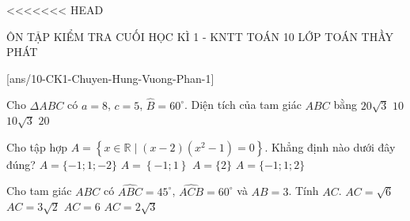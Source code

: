 <<<<<<< HEAD
\begin{name}
	{ÔN TẬP KIỂM TRA CUỐI HỌC KÌ 1 - KNTT}
	{TOÁN 10}
	{LỚP TOÁN THẦY PHÁT}
	{\thoigian}
\end{name}

\caulc
{}[ans/10-CK1-Chuyen-Hung-Vuong-Phan-1]
\begin{ex}%
	Cho $\mathit{\Delta}ABC$ có $a=8$, $c=5$, $\widehat{B}=60^\circ $. Diện tích của tam giác $ABC$ bằng
	\choice
	{$20\sqrt{3}$}
	{$10$}
	{\True $10\sqrt{3}$}
	{$20$}
\end{ex}
\begin{ex}%
	 Cho tập hợp $A=\left\{x\in \mathbb{R}\mid(x-2)\left(x^2-1\right)=0\right\}$. Khẳng định nào dưới đây đúng? 
	\choice
	{$A=\{-1;1;-2\}$}
	{$A=\left\{-1;1\right\}$}
	{$A=\{2\}$}
	{\True $A=\{-1;1;2\}$}
\end{ex}
\begin{ex}%
	Cho tam giác $ABC$ có $\widehat{ABC}=45^\circ$, $\widehat{ACB}=60^\circ$ và $AB=3$. Tính $AC$.
	\choice
	{\True $AC=\sqrt{6}$}
	{$AC=3\sqrt{2}$}
	{$AC=6$}
	{$AC=2\sqrt{3}$}
\end{ex}
